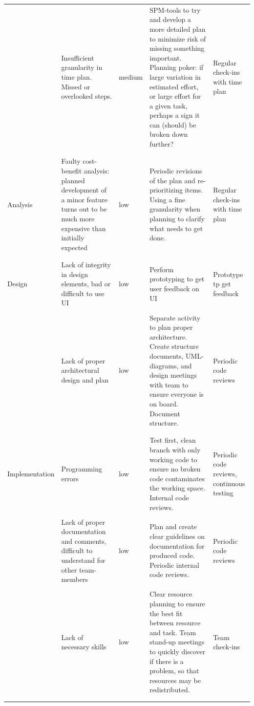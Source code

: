 \documentclass[titlepage]{article}
\begin{document}
\begin{center}
\begin{longtable}{p{2.1cm}|p{3.5cm}p{1.2cm}p{3.5cm}p{1.7cm}}
\\
& Insufficient granularity in time plan. Missed or overlooked steps. & medium & SPM-tools to try and develop a more detailed plan to minimize risk of missing something important. Planning poker: if large variation in estimated effort, or large effort for a given task, perhaps a sign it can (should) be broken down further? & Regular check-ins with time plan \\
\\
\hline
\\
Analysis &  Faulty cost-benefit analysis: planned development of a minor feature turns out to be much more expensive than initially expected & low & Periodic revisions of the plan and re-prioritizing items. Using a fine granularity when planning to clarify what needs to get done. & Regular check-ins with time plan \\
\\
\hline
\\
Design &  Lack of integrity in design elements, bad or difficult to use UI & low & Perform prototyping to get user feedback on UI & Prototype tp get feedback \\
\\
&  Lack of proper architectural design and plan & low & Separate activity to plan proper architecture. Create structure documents, UML-diagrams, and design meetings with team to ensure everyone is on board. Document structure. & Periodic code reviews \\
\\
\hline
\\
Implementation &  Programming errors & low & Test first, clean branch with only working code to ensure no broken code contaminates the working space. Internal code reviews. & Periodic code reviews, continuous testing \\
\\
&  Lack of proper documentation and comments, difficult to understand for other team-members & low & Plan and create clear guidelines on documentation for produced code. Periodic internal code reviews. & Periodic code reviews \\
\\
&  Lack of necessary skills & low & Clear resource planning to ensure the best fit between resource and task. Team stand-up meetings to quickly discover if there is a problem, so that resources may be redistributed. & Team check-ins \\
\\
\hline
\\

\end{longtable}
\end{center}
\end{document}
